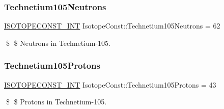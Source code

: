 \subsubsection{\texorpdfstring{Technetium105\+Neutrons}{Technetium105Neutrons}}
{\footnotesize\ttfamily \mbox{\hyperlink{group___isotope_const-_macros_ga5f18360b3e99483a35c32d789e62621c}{I\+S\+O\+T\+O\+P\+E\+C\+O\+N\+S\+T\+\_\+\+I\+NT}} Isotope\+Const\+::\+Technetium105\+Neutrons = 62}

\$ \$ Neutrons in Technetium-\/105. \mbox{\label{group___isotope_const-_technetium-_tc105_ga4aee73e578ca43db235d6166189e9ab1}} 
\subsubsection{\texorpdfstring{Technetium105\+Protons}{Technetium105Protons}}
{\footnotesize\ttfamily \mbox{\hyperlink{group___isotope_const-_macros_ga5f18360b3e99483a35c32d789e62621c}{I\+S\+O\+T\+O\+P\+E\+C\+O\+N\+S\+T\+\_\+\+I\+NT}} Isotope\+Const\+::\+Technetium105\+Protons = 43}

\$ \$ Protons in Technetium-\/105. 